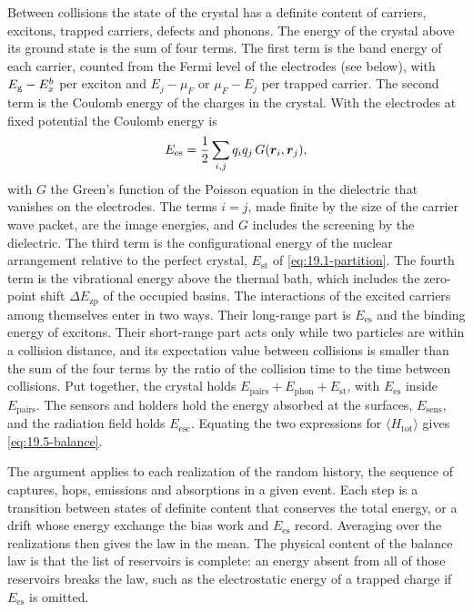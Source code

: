 Between collisions the state of the crystal has a definite content of carriers, excitons, trapped carriers, defects and phonons. The energy of the crystal above its ground state is the sum of four terms. The first term is the band energy of each carrier, counted from the Fermi level of the electrodes (see below), with $E_{\mathrm{g}} - E_x^b$ per exciton and $E_j - \mu_F$ or $\mu_F - E_j$ per trapped carrier. The second term is the Coulomb energy of the charges in the crystal. With the electrodes at fixed potential the Coulomb energy is
\begin{equation*}
  E_{\mathrm{es}} = \frac12\sum_{i,j}q_iq_j\,G(\bm{r}_i,\bm{r}_j) ,
\end{equation*}
with $G$ the Green's function of the Poisson equation in the dielectric that vanishes on the electrodes. The terms $i = j$, made finite by the size of the carrier wave packet, are the image energies, and $G$ includes the screening by the dielectric. The third term is the configurational energy of the nuclear arrangement relative to the perfect crystal, $E_{\mathrm{st}}$ of \cref{eq:19.1-partition}. The fourth term is the vibrational energy above the thermal bath, which includes the zero-point shift $\Delta E_{\mathrm{zp}}$ of the occupied basins. The interactions of the excited carriers among themselves enter in two ways. Their long-range part is $E_{\mathrm{es}}$ and the binding energy of excitons. Their short-range part acts only while two particles are within a collision distance, and its expectation value between collisions is smaller than the sum of the four terms by the ratio of the collision time to the time between collisions. Put together, the crystal holds $E_{\mathrm{pairs}} + E_{\mathrm{phon}} + E_{\mathrm{st}}$, with $E_{\mathrm{es}}$ inside $E_{\mathrm{pairs}}$. The sensors and holders hold the energy absorbed at the surfaces, $E_{\mathrm{sens}}$, and the radiation field holds $E_{\mathrm{esc}}$. Equating the two expressions for $\langle H_{\mathrm{tot}}\rangle$ gives \cref{eq:19.5-balance}.

The argument applies to each realization of the random history, the sequence of captures, hops, emissions and absorptions in a given event. Each step is a transition between states of definite content that conserves the total energy, or a drift whose energy exchange the bias work and $E_{\mathrm{es}}$ record. Averaging over the realizations then gives the law in the mean. The physical content of the balance law is that the list of reservoirs is complete: an energy absent from all of those reservoirs breaks the law, such as the electrostatic energy of a trapped charge if $E_{\mathrm{es}}$ is omitted.

